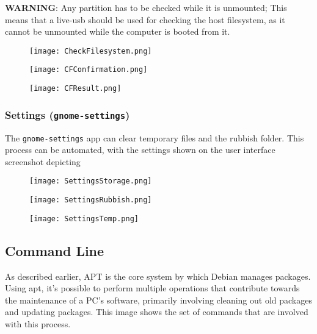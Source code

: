 \documentclass[11pt]{amsart}
\newcommand{\admonition}[2]{\textbf{#1}: {#2}}
\begin{document}
\admonition{WARNING}{Any partition has to be checked while it is unmounted; This means that a live-usb should be used for checking the host filesystem, as it cannot be unmounted while the computer is booted from it.}
\begin{figure}[h]{}
\centering\texttt{[image: CheckFilesystem.png]}
\caption{}

\end{figure}

\begin{figure}[h]{}
\centering\texttt{[image: CFConfirmation.png]}
\caption{}

\end{figure}

\begin{figure}[h]{}
\centering\texttt{[image: CFResult.png]}
\caption{}

\end{figure}

\hypertarget{x-settings-(\texttt{gnome-settings})}{\subsubsection*{Settings (\texttt{gnome-settings})}}
The \texttt{gnome-settings} app can clear temporary files and the rubbish folder. This process can be automated, with the settings shown on the user interface screenshot depicting


\begin{figure}[h]{}
\centering\texttt{[image: SettingsStorage.png]}
\caption{}

\end{figure}

\begin{figure}[h]{}
\centering\texttt{[image: SettingsRubbish.png]}
\caption{}

\end{figure}

\begin{figure}[h]{}
\centering\texttt{[image: SettingsTemp.png]}
\caption{}

\end{figure}

\hypertarget{x-command-line}{\subsection*{Command Line}}
As described earlier, APT is the core system by which Debian manages packages. Using apt, it’s possible to perform multiple operations that contribute towards the maintenance of a PC’s software, primarily involving cleaning out old packages and updating packages. This image shows the set of commands that are involved with this process.
\end{document}
